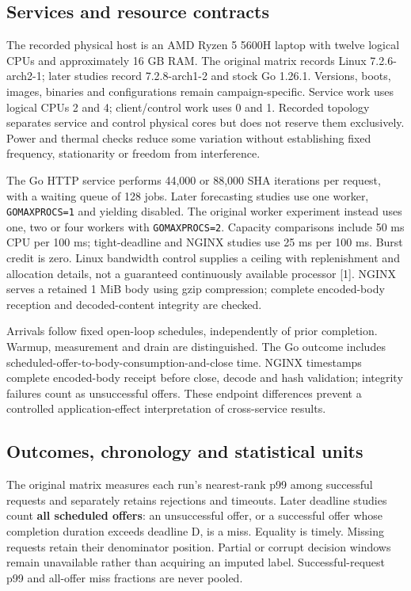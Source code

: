 \documentclass[10pt,a4paper]{article}
\begin{document}
\subsection{Services and resource contracts}

The recorded physical host is an AMD Ryzen 5 5600H laptop with twelve logical CPUs and approximately 16 GB RAM. The original matrix records Linux 7.2.6-arch2-1; later studies record 7.2.8-arch1-2 and stock Go 1.26.1. Versions, boots, images, binaries and configurations remain campaign-specific. Service work uses logical CPUs 2 and 4; client/control work uses 0 and 1. Recorded topology separates service and control physical cores but does not reserve them exclusively. Power and thermal checks reduce some variation without establishing fixed frequency, stationarity or freedom from interference.

The Go HTTP service performs 44,000 or 88,000 SHA iterations per request, with a waiting queue of 128 jobs. Later forecasting studies use one worker, \texttt{GOMAXPROCS=1} and yielding disabled. The original worker experiment instead uses one, two or four workers with \texttt{GOMAXPROCS=2}. Capacity comparisons include 50 ms CPU per 100 ms; tight-deadline and NGINX studies use 25 ms per 100 ms. Burst credit is zero. Linux bandwidth control supplies a ceiling with replenishment and allocation details, not a guaranteed continuously available processor [1]. NGINX serves a retained 1 MiB body using gzip compression; complete encoded-body reception and decoded-content integrity are checked.

Arrivals follow fixed open-loop schedules, independently of prior completion. Warmup, measurement and drain are distinguished. The Go outcome includes scheduled-offer-to-body-consumption-and-close time. NGINX timestamps complete encoded-body receipt before close, decode and hash validation; integrity failures count as unsuccessful offers. These endpoint differences prevent a controlled application-effect interpretation of cross-service results.

\subsection{Outcomes, chronology and statistical units}

The original matrix measures each run's nearest-rank p99 among successful requests and separately retains rejections and timeouts. Later deadline studies count \textbf{all scheduled offers}: an unsuccessful offer, or a successful offer whose completion duration exceeds deadline D, is a miss. Equality is timely. Missing requests retain their denominator position. Partial or corrupt decision windows remain unavailable rather than acquiring an imputed label. Successful-request p99 and all-offer miss fractions are never pooled.
\end{document}
